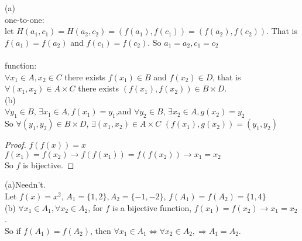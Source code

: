 \documentclass[a4paper, justified]{tufte-handout}
\begin{document}
\begin{solution}
	(a)\\
	one-to-one:\\
	let $H(a_1, c_1) = H(a_2, c_2) = (f(a_1), f(c_1)) = (f(a_2), f(c_2))$. That is $f(a_1) = f(a_2)$ and $f(c_1) = f(c_2)$. So $a_1 = a_2, c_1 = c_2$\\
	\\
	function:\\
	$\forall x_1 \in A,x_2 \in C$ there exists $f(x_1) \in B$ and $f(x_2) \in D$, that is $\forall (x_1, x_2) \in A\times C$ there exists $(f(x_1), f(x_2)) \in B \times D$.\\
	(b)\\
	$\forall y_1 \in B$, $\exists x_1 \in A, f(x_1) = y_1$,and $\forall y_2 \in B$, $\exists x_2 \in A, g(x_2) = y_2$\\
	So $\forall (y_1, y_2) \in B\times D$, $\exists (x_1, x_2) \in A \times C$ $(f(x_1), g(x_2)) = (y_1, y_2)$\\
\end{solution}

\begin{problem}[UD Problem 16.22]
\end{problem}

\begin{proof}
	$f(f(x)) = x$
	$f(x_1) = f(x_2)\rightarrow f(f(x_1)) = f(f(x_2)) \rightarrow x_1 = x_2$\\
	So $f$ is bijective.
\end{proof}

\begin{problem}[UD Problem 17.22]
\end{problem}

\begin{solution}
	(a)Needn't.\\
	Let $f(x) = x^2$, $A_1 = \{1, 2\}, A_2 = \{-1, -2\}$, $f(A_1) = f(A_2) = \{1, 4\}$\\
	(b) $\forall x_1 \in A_1, \forall x_2 \in A_2$, for $f$ is a bijective function, $f(x_1) = f(x_2) \rightarrow x_1 = x_2$.\\
	So if $f(A_1) = f(A_2)$, then $\forall x_1 \in A_1 \Leftrightarrow  \forall x_2 \in A_2, \Rightarrow A_1 = A_2$.
\end{solution}

\begin{problem}[UD Problem 17.23]
\end{problem}
\end{document}
